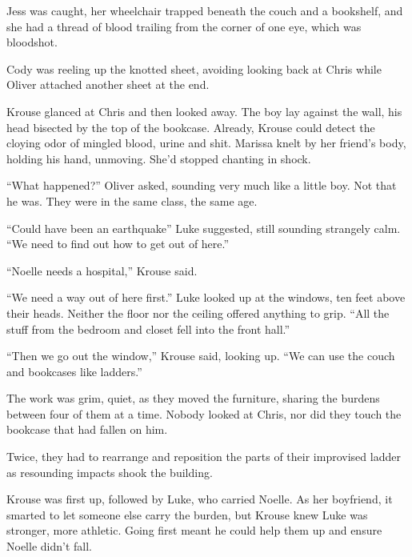Jess was caught, her wheelchair trapped beneath the couch and a bookshelf, and she had a thread of blood trailing from the corner of one eye, which was bloodshot.



Cody was reeling up the knotted sheet, avoiding looking back at Chris while Oliver attached another sheet at the end.



Krouse glanced at Chris and then looked away.  The boy lay against the wall, his head bisected by the top of the bookcase.  Already, Krouse could detect the cloying odor of mingled blood, urine and shit.  Marissa knelt by her friend's body, holding his hand, unmoving.  She'd stopped chanting in shock.



``What happened?''  Oliver asked, sounding very much like a little boy.  Not that he was.  They were in the same class, the same age.



``Could have been an earthquake'' Luke suggested, still sounding strangely calm.  ``We need to find out how to get out of here.''



``Noelle needs a hospital,'' Krouse said.



``We need a way out of here first.''  Luke looked up at the windows, ten feet above their heads.  Neither the floor nor the ceiling offered anything to grip.  ``All the stuff from the bedroom and closet fell into the front hall.''



``Then we go out the window,'' Krouse said, looking up.  ``We can use the couch and bookcases like ladders.''



The work was grim, quiet, as they moved the furniture, sharing the burdens between four of them at a time.  Nobody looked at Chris, nor did they touch the bookcase that had fallen on him.



Twice, they had to rearrange and reposition the parts of their improvised ladder as resounding impacts shook the building.



Krouse was first up, followed by Luke, who carried Noelle.  As her boyfriend, it smarted to let someone else carry the burden, but Krouse knew Luke was stronger, more athletic.  Going first meant he could help them up and ensure Noelle didn't fall.



